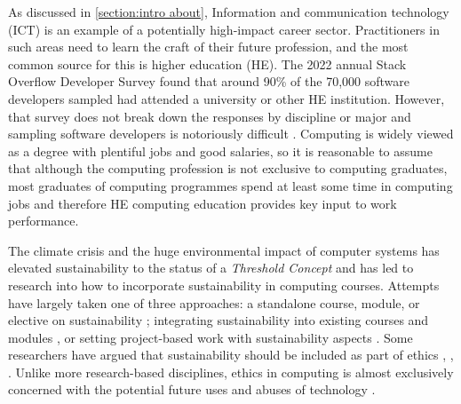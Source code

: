 As discussed in \autoref{section:intro about}, Information and communication technology (ICT) is an example of a potentially high-impact career sector. Practitioners in such areas need to learn the craft of their future profession, and the most common source for this is higher education (HE). The 2022 annual Stack Overflow Developer Survey \citep{StackOverflow2022} found that around 90\% of the 70,000 software developers sampled had attended a university or other HE institution. However, that survey does not break down the responses by discipline or major and sampling software developers is notoriously difficult \citep{Baltes2016}.  Computing is widely viewed as a degree with  plentiful jobs and good salaries, so it is reasonable to assume that although the computing profession is not exclusive to computing graduates, most graduates of computing programmes spend at least some time in computing jobs and therefore HE computing education provides key input to work performance. 

The climate crisis and the huge environmental impact of computer systems has elevated sustainability to the status of a \emph{Threshold Concept} \citep{Rodger2015} \citep{Cousin2006} and has led to research into how to incorporate sustainability in computing courses. Attempts have largely taken one of three \citep{Pattinson2011} approaches: a standalone course, module, or elective on sustainability \citep{Penzenstadler2011a} \citep{Penzenstadler2018} \citep{Cai2010}; integrating sustainability into existing courses and modules \citep{Abernethy2014} \citep{Mishra2021}, or setting project-based work with sustainability aspects \citep{Jaccheri2021} \citep{KaskeJr2022}. Some researchers have argued that sustainability should be included as part of ethics \citep{Ozkaya2019}, \citep{Moraga2017}, \citep{Bednar2020}. Unlike more research-based disciplines, ethics in computing is almost exclusively concerned with the potential future uses and abuses of technology \citep{Alidoosti2022}.

